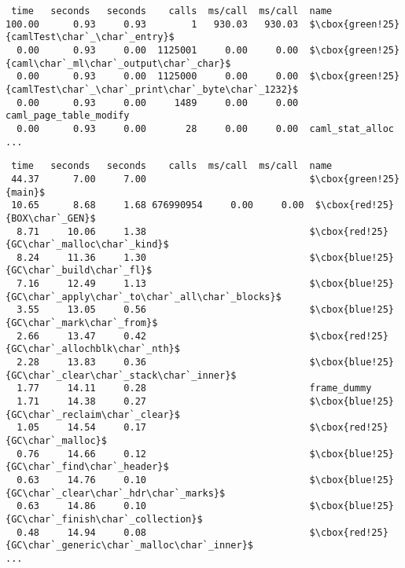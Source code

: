 \begin{lstlisting}[basicstyle=\ttfamily\footnotesize,
basewidth={.5em,.3em}, frame=single]
  %   cumulative   self              self     total           
 time   seconds   seconds    calls  ms/call  ms/call  name    
100.00      0.93     0.93        1   930.03   930.03  $\cbox{green!25}{camlTest\char`_\char`_entry}$
  0.00      0.93     0.00  1125001     0.00     0.00  $\cbox{green!25}{caml\char`_ml\char`_output\char`_char}$
  0.00      0.93     0.00  1125000     0.00     0.00  $\cbox{green!25}{camlTest\char`_\char`_print\char`_byte\char`_1232}$
  0.00      0.93     0.00     1489     0.00     0.00  caml_page_table_modify
  0.00      0.93     0.00       28     0.00     0.00  caml_stat_alloc
...
\end{lstlisting}
\begin{lstlisting}[basicstyle=\ttfamily\footnotesize,
basewidth={.5em,.3em}, frame=single]
  %   cumulative   self              self     total           
 time   seconds   seconds    calls  ms/call  ms/call  name    
 44.37      7.00     7.00                             $\cbox{green!25}{main}$
 10.65      8.68     1.68 676990954     0.00     0.00  $\cbox{red!25}{BOX\char`_GEN}$
  8.71     10.06     1.38                             $\cbox{red!25}{GC\char`_malloc\char`_kind}$
  8.24     11.36     1.30                             $\cbox{blue!25}{GC\char`_build\char`_fl}$
  7.16     12.49     1.13                             $\cbox{blue!25}{GC\char`_apply\char`_to\char`_all\char`_blocks}$
  3.55     13.05     0.56                             $\cbox{blue!25}{GC\char`_mark\char`_from}$
  2.66     13.47     0.42                             $\cbox{red!25}{GC\char`_allochblk\char`_nth}$
  2.28     13.83     0.36                             $\cbox{blue!25}{GC\char`_clear\char`_stack\char`_inner}$
  1.77     14.11     0.28                             frame_dummy
  1.71     14.38     0.27                             $\cbox{blue!25}{GC\char`_reclaim\char`_clear}$
  1.05     14.54     0.17                             $\cbox{red!25}{GC\char`_malloc}$
  0.76     14.66     0.12                             $\cbox{blue!25}{GC\char`_find\char`_header}$
  0.63     14.76     0.10                             $\cbox{blue!25}{GC\char`_clear\char`_hdr\char`_marks}$
  0.63     14.86     0.10                             $\cbox{blue!25}{GC\char`_finish\char`_collection}$
  0.48     14.94     0.08                             $\cbox{red!25}{GC\char`_generic\char`_malloc\char`_inner}$
...
\end{lstlisting}

